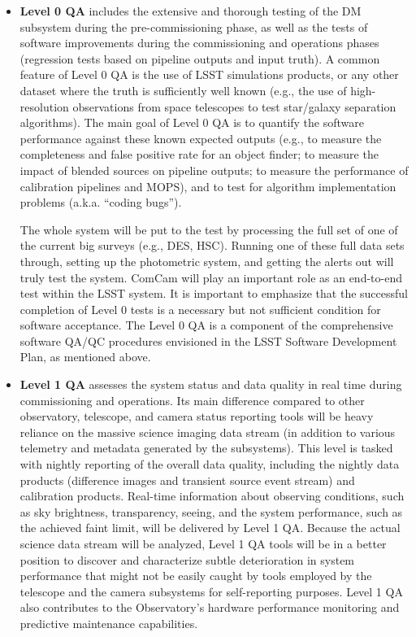 \documentclass[SE,toc,lsstdraft]{lsstdoc}
\begin{document}
\begin{itemize}
\item \textbf{Level 0 QA} includes the extensive and thorough testing of the DM subsystem
during the pre-commissioning phase, as well as the tests of software improvements
during the commissioning and operations phases (regression tests based on pipeline
outputs and input truth). A common feature of Level 0 QA is
the use of LSST simulations products, or any other dataset where the truth is sufficiently
well known (e.g., the use of high-resolution observations from space telescopes to test
star/galaxy separation algorithms). The main goal of Level 0 QA is to quantify the
software performance against these known expected outputs (e.g., to measure the
completeness and false positive rate for an object finder; to measure the impact of
blended sources on pipeline outputs; to measure the performance of calibration pipelines
and MOPS), and to test for algorithm implementation problems (a.k.a. ``coding bugs'').

The whole system will be put to the test by processing the full set of one of the current big surveys (e.g., DES, HSC). Running one of these full data sets through, setting up the photometric system, and getting the alerts out will truly test the system.
ComCam will play an important role as an end-to-end test within the LSST system.
It is important to emphasize that the successful completion of Level 0 tests is a necessary
but not sufficient condition for software acceptance. The Level 0 QA is a component of the comprehensive software QA/QC procedures envisioned in the LSST Software Development Plan, as mentioned above.

\item \textbf{Level 1 QA} assesses the system status and data quality in real time during
commissioning and operations. Its
main difference compared to other observatory, telescope, and camera status reporting
tools will be heavy reliance on the massive science imaging data stream (in addition to various
telemetry and metadata generated by the subsystems). This level is tasked
with nightly reporting of the overall data quality, including the nightly data products
(difference images and transient source event stream) and calibration products.
Real-time information about observing conditions, such as sky brightness,
transparency, seeing, and the system performance, such as the achieved faint limit, will be delivered
by Level 1 QA. Because the actual science data stream will be analyzed, Level 1 QA tools will be
in a better position to discover and characterize subtle deterioration in system performance
that might not be easily caught by tools employed by the telescope
and the camera subsystems for self-reporting purposes. Level 1 QA also contributes to the Observatory's hardware performance monitoring and predictive maintenance capabilities.


\end{itemize}
\end{document}

